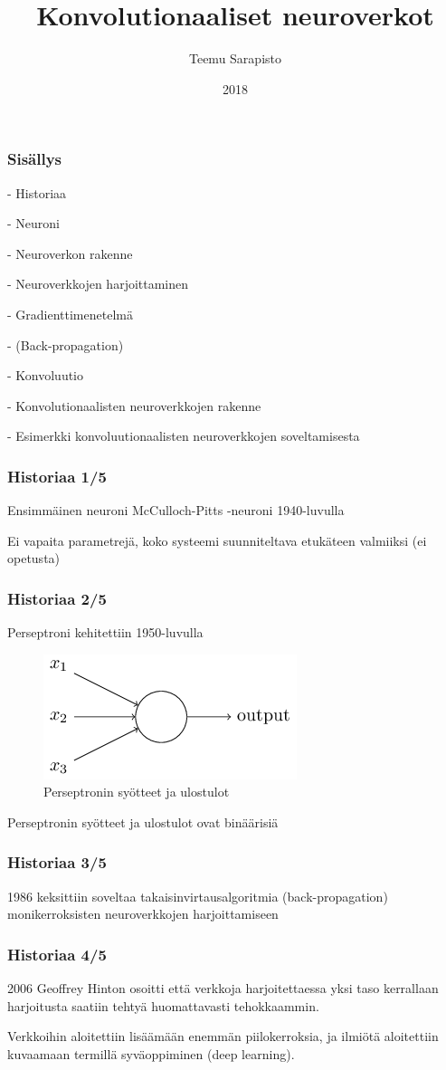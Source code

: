 \documentclass{beamer}
\title{Konvolutionaaliset neuroverkot}
\author{Teemu Sarapisto}
\institute{Helsingin Yliopisto}
\date{2018}
\begin{document}
\frame{\titlepage}

\begin{frame}
    \frametitle{Sisällys}
    - Historiaa

    - Neuroni

    - Neuroverkon rakenne

    - Neuroverkkojen harjoittaminen

    - Gradienttimenetelmä

    - (Back-propagation)

    - Konvoluutio

    - Konvolutionaalisten neuroverkkojen rakenne

    - Esimerkki konvoluutionaalisten neuroverkkojen soveltamisesta
\end{frame}

\begin{frame}
    \frametitle{Historiaa 1/5}
    Ensimmäinen neuroni McCulloch-Pitts -neuroni 1940-luvulla

    Ei vapaita parametrejä, koko systeemi suunniteltava etukäteen valmiiksi (ei opetusta)
\end{frame}

\begin{frame}
    \frametitle{Historiaa 2/5}
    Perseptroni kehitettiin 1950-luvulla

    \begin{figure}[h]
        \label{pic:perceptron}
        \centering
        \includegraphics[scale=0.5]{perceptron}
        \caption{Perseptronin syötteet ja ulostulot}
    \end{figure}

    Perseptronin syötteet ja ulostulot ovat binäärisiä

\end{frame}

\begin{frame}
    \frametitle{Historiaa 3/5}
    1986 keksittiin soveltaa takaisinvirtausalgoritmia (back-propagation) monikerroksisten
    neuroverkkojen harjoittamiseen
\end{frame}

\begin{frame}
    \frametitle{Historiaa 4/5}
    2006 Geoffrey Hinton osoitti että verkkoja harjoitettaessa yksi taso kerrallaan
    harjoitusta saatiin tehtyä huomattavasti tehokkaammin.

    Verkkoihin aloitettiin lisäämään enemmän piilokerroksia, ja ilmiötä
    aloitettiin kuvaamaan termillä syväoppiminen (deep learning).
\end{frame}
\end{document}
